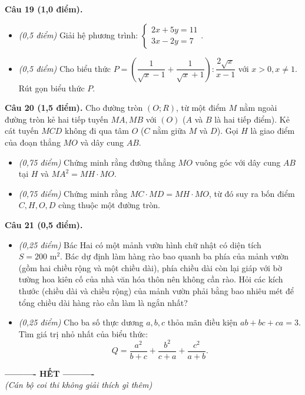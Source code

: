 \documentclass[11pt,a4paper]{article}
\begin{document}
\vspace{2mm}
\textbf{Câu 19 (1,0 điểm).}
\begin{itemize}
  \item[a)] \textit{(0,5 điểm)} Giải hệ phương trình: $\begin{cases} 2x + 5y = 11 \\ 3x - 2y = 7 \end{cases}$.
  \item[b)] \textit{(0,5 điểm)} Cho biểu thức $P = \left( \dfrac{1}{\sqrt{x}-1} + \dfrac{1}{\sqrt{x}+1} \right) : \dfrac{2\sqrt{x}}{x-1}$ với $x > 0, x \ne 1$. Rút gọn biểu thức $P$.
\end{itemize}

\vspace{2mm}
\textbf{Câu 20 (1,5 điểm).} Cho đường tròn $(O; R)$, từ một điểm $M$ nằm ngoài đường tròn kẻ hai tiếp tuyến $MA, MB$ với $(O)$ ($A$ và $B$ là hai tiếp điểm). Kẻ cát tuyến $MCD$ không đi qua tâm $O$ ($C$ nằm giữa $M$ và $D$). Gọi $H$ là giao điểm của đoạn thẳng $MO$ và dây cung $AB$.
\begin{itemize}
  \item[a)] \textit{(0,75 điểm)} Chứng minh rằng đường thẳng $MO$ vuông góc với dây cung $AB$ tại $H$ và $MA^2 = MH \cdot MO$.
  \item[b)] \textit{(0,75 điểm)} Chứng minh rằng $MC \cdot MD = MH \cdot MO$, từ đó suy ra bốn điểm $C, H, O, D$ cùng thuộc một đường tròn.
\end{itemize}

\vspace{2mm}
\textbf{Câu 21 (0,5 điểm).}
\begin{itemize}
  \item[a)] \textit{(0,25 điểm)} Bác Hai có một mảnh vườn hình chữ nhật có diện tích $S = 200\text{ m}^2$. Bác dự định làm hàng rào bao quanh ba phía của mảnh vườn (gồm hai chiều rộng và một chiều dài), phía chiều dài còn lại giáp với bờ tường hoa kiên cố của nhà văn hóa thôn nên không cần rào. Hỏi các kích thước (chiều dài và chiều rộng) của mảnh vườn phải bằng bao nhiêu mét để tổng chiều dài hàng rào cần làm là ngắn nhất?
  \item[b)] \textit{(0,25 điểm)} Cho ba số thực dương $a, b, c$ thỏa mãn điều kiện $ab + bc + ca = 3$. Tìm giá trị nhỏ nhất của biểu thức:
  \[
  Q = \dfrac{a^2}{b+c} + \dfrac{b^2}{c+a} + \dfrac{c^2}{a+b}.
  \]
\end{itemize}

\vspace{4mm}
\begin{center}
\textbf{---------- HẾT ----------}\\
\textit{(Cán bộ coi thi không giải thích gì thêm)}
\end{center}
\end{document}

